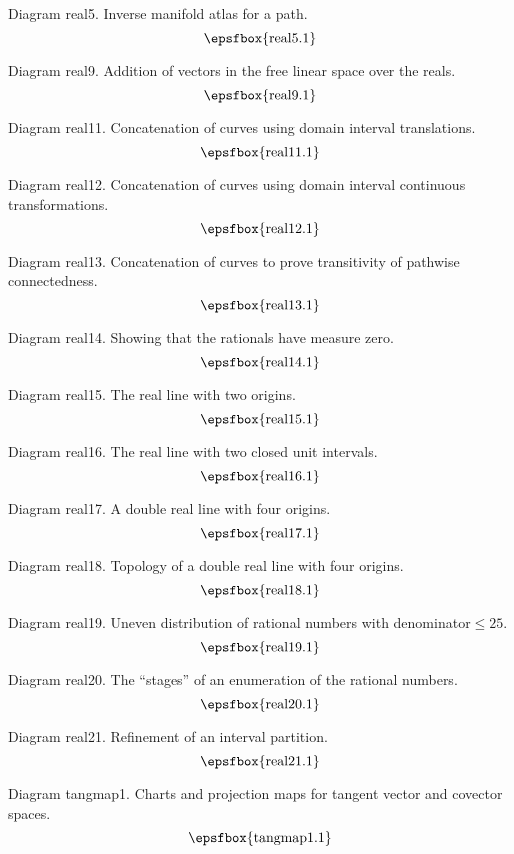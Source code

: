 \filleject

Diagram real5. Inverse manifold atlas for a path.
$$
\centerline{\epsfbox{real5.1}}
$$

Diagram real9. Addition of vectors in the free linear space over the reals.
$$
\centerline{\epsfbox{real9.1}}
$$

Diagram real11. Concatenation of curves using domain interval translations.
$$
\centerline{\epsfbox{real11.1}}
$$

\filleject

Diagram real12. Concatenation of curves using domain interval continuous
transformations.
$$
\centerline{\epsfbox{real12.1}}
$$

Diagram real13. Concatenation of curves to prove transitivity of pathwise
connectedness.
$$
\centerline{\epsfbox{real13.1}}
$$

Diagram real14. Showing that the rationals have measure zero.
$$
\centerline{\epsfbox{real14.1}}
$$

Diagram real15. The real line with two origins.
$$
\centerline{\epsfbox{real15.1}}
$$

\filleject

Diagram real16. The real line with two closed unit intervals.
$$
\centerline{\epsfbox{real16.1}}
$$

Diagram real17. A double real line with four origins.
$$
\centerline{\epsfbox{real17.1}}
$$

Diagram real18. Topology of a double real line with four origins.
$$
\centerline{\epsfbox{real18.1}}
$$

Diagram real19. Uneven distribution of rational numbers with
denominator${}\le25$.
$$
\centerline{\epsfbox{real19.1}}
$$

Diagram real20. The ``stages'' of an enumeration of the rational numbers.
$$
\centerline{\epsfbox{real20.1}}
$$

Diagram real21. Refinement of an interval partition.
$$
\centerline{\epsfbox{real21.1}}
$$

\secteject
\edef\SECTtangmap{\the\pageno}

Diagram tangmap1. Charts and projection maps for tangent vector and covector
spaces.
$$
\centerline{\epsfbox{tangmap1.1}}
$$

